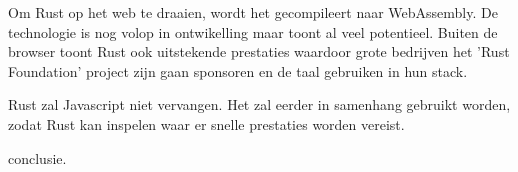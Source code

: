 \documentclass[11pt,a4paper,oneside]{book}
\begin{document}
Om Rust op het web te draaien, wordt het gecompileert naar WebAssembly. De technologie is nog volop
in ontwikelling maar toont al veel potentieel. Buiten de browser toont Rust ook uitstekende
prestaties waardoor grote bedrijven het 'Rust Foundation' project zijn gaan sponsoren en de taal
gebruiken in hun stack.

Rust zal Javascript niet vervangen. Het zal eerder in samenhang gebruikt worden, zodat Rust kan
inspelen waar er snelle prestaties worden vereist.

conclusie.


\tableofcontents


\listoffigures

\printglossary[title=Lijst met afkortingen,toctitle=Lijst met afkortingen,type=acronym]
\printglossary[title=Verklarende woordenlijst,toctitle=Verklarende woordenlijst,type=main]
\glsaddallunused









\appendix

\end{document}
